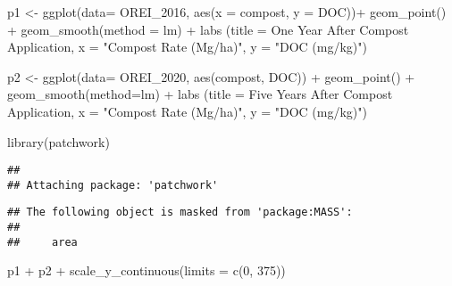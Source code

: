\documentclass[
]{article}
\newenvironment{Shaded}{\begin{snugshade}}{\end{snugshade}}
\newcommand{\AttributeTok}[1]{\textcolor[rgb]{0.77,0.63,0.00}{#1}}
\newcommand{\DecValTok}[1]{\textcolor[rgb]{0.00,0.00,0.81}{#1}}
\newcommand{\FunctionTok}[1]{\textcolor[rgb]{0.00,0.00,0.00}{#1}}
\newcommand{\NormalTok}[1]{#1}
\newcommand{\OtherTok}[1]{\textcolor[rgb]{0.56,0.35,0.01}{#1}}
\newcommand{\SpecialCharTok}[1]{\textcolor[rgb]{0.00,0.00,0.00}{#1}}
\newcommand{\StringTok}[1]{\textcolor[rgb]{0.31,0.60,0.02}{#1}}
\begin{document}
\begin{Shaded}
\begin{Highlighting}[]
\NormalTok{p1 }\OtherTok{\textless{}{-}} \FunctionTok{ggplot}\NormalTok{(}\AttributeTok{data=}\NormalTok{ OREI\_2016, }\FunctionTok{aes}\NormalTok{(}\AttributeTok{x =}\NormalTok{ compost, }\AttributeTok{y =}\NormalTok{ DOC))}\SpecialCharTok{+}
  \FunctionTok{geom\_point}\NormalTok{() }\SpecialCharTok{+}
  \FunctionTok{geom\_smooth}\NormalTok{(}\AttributeTok{method =} \StringTok{\textquotesingle{}lm\textquotesingle{}}\NormalTok{) }\SpecialCharTok{+}
  \FunctionTok{labs}\NormalTok{ (}\AttributeTok{title =} \StringTok{\textquotesingle{}One Year After Compost Application\textquotesingle{}}\NormalTok{, }
        \AttributeTok{x =} \StringTok{"Compost Rate (Mg/ha)"}\NormalTok{, }\AttributeTok{y =} \StringTok{"DOC (mg/kg)"}\NormalTok{)}

\NormalTok{p2 }\OtherTok{\textless{}{-}} \FunctionTok{ggplot}\NormalTok{(}\AttributeTok{data=}\NormalTok{ OREI\_2020, }\FunctionTok{aes}\NormalTok{(compost, DOC)) }\SpecialCharTok{+}
  \FunctionTok{geom\_point}\NormalTok{() }\SpecialCharTok{+}
  \FunctionTok{geom\_smooth}\NormalTok{(}\AttributeTok{method=}\StringTok{\textquotesingle{}lm\textquotesingle{}}\NormalTok{) }\SpecialCharTok{+}
  \FunctionTok{labs}\NormalTok{ (}\AttributeTok{title =} \StringTok{\textquotesingle{}Five Years After Compost Application\textquotesingle{}}\NormalTok{, }
        \AttributeTok{x =} \StringTok{"Compost Rate (Mg/ha)"}\NormalTok{, }\AttributeTok{y =} \StringTok{"DOC (mg/kg)"}\NormalTok{)}

\FunctionTok{library}\NormalTok{(patchwork)}
\end{Highlighting}
\end{Shaded}

\begin{verbatim}
## 
## Attaching package: 'patchwork'
\end{verbatim}

\begin{verbatim}
## The following object is masked from 'package:MASS':
## 
##     area
\end{verbatim}

\begin{Shaded}
\begin{Highlighting}[]
\NormalTok{p1 }\SpecialCharTok{+}\NormalTok{ p2 }\SpecialCharTok{+} \FunctionTok{scale\_y\_continuous}\NormalTok{(}\AttributeTok{limits =} \FunctionTok{c}\NormalTok{(}\DecValTok{0}\NormalTok{, }\DecValTok{375}\NormalTok{)) }
\end{Highlighting}
\end{Shaded}
\end{document}
